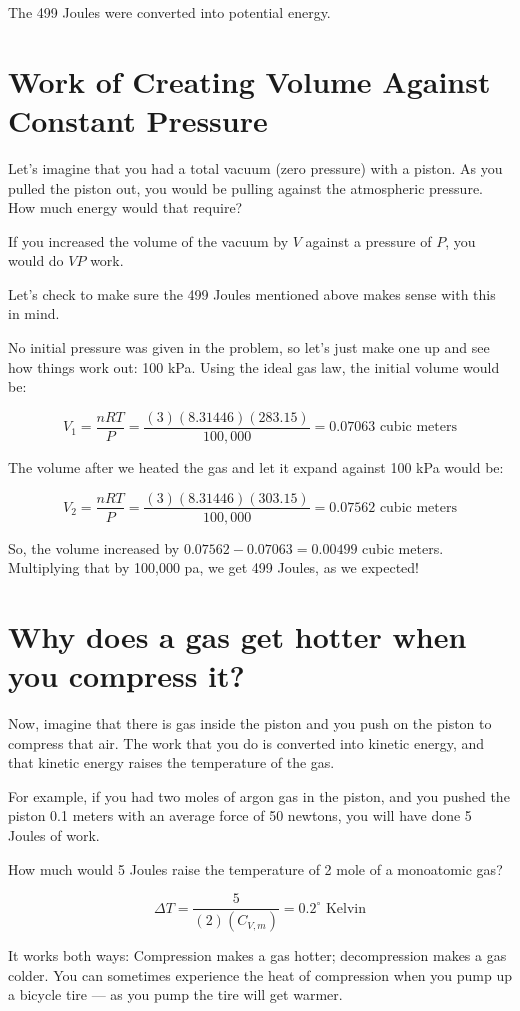 The 499 Joules were converted into potential energy.  

\section{Work of Creating Volume Against Constant Pressure}

Let's imagine that you had a total vacuum (zero pressure) with a piston. As you pulled the piston out, you would be pulling against the atmospheric pressure. How much energy would that require?

If you increased the volume of the vacuum by $V$ against a pressure of $P$, you would do $VP$ work.

Let's check to make sure the 499 Joules mentioned above makes sense with this in mind.

No initial pressure was given in the problem, so let's just make one up and see how things work out: 100 kPa. Using the ideal gas law, the initial volume would be:

$$V_1 = \frac{n R T}{P} = \frac{(3)(8.31446)(283.15)}{100,000} = 0.07063\text{ cubic meters}$$

The volume after we heated the gas and let it expand against 100 kPa would be:

$$V_2 = \frac{n R T}{P} = \frac{(3)(8.31446)(303.15)}{100,000} = 0.07562\text{ cubic meters}$$

So, the volume increased by $0.07562 - 0.07063 = 0.00499$ cubic meters.  
Multiplying that by 100,000 pa, we get 499 Joules, as we expected!

\section{Why does a gas get hotter when you compress it?}

Now, imagine that there is gas inside the piston and you push on the piston to compress that air.  The work that you do is converted into kinetic energy, and that kinetic energy raises the temperature of the gas.

For example, if you had two moles of argon gas in the piston, and you pushed the piston 0.1 meters with an average force of 50 newtons, you will have done 5 Joules of work.

How much would 5 Joules raise the temperature of 2 mole of a monoatomic gas? 

$$\Delta T = \frac{5}{(2)(C_{V,m})} = 0.2^\circ \text{ Kelvin}$$ 

It works both ways: Compression makes a gas hotter; decompression makes a gas colder. You can sometimes experience the heat of compression when you pump up a bicycle tire --- as you pump the tire will get warmer.

